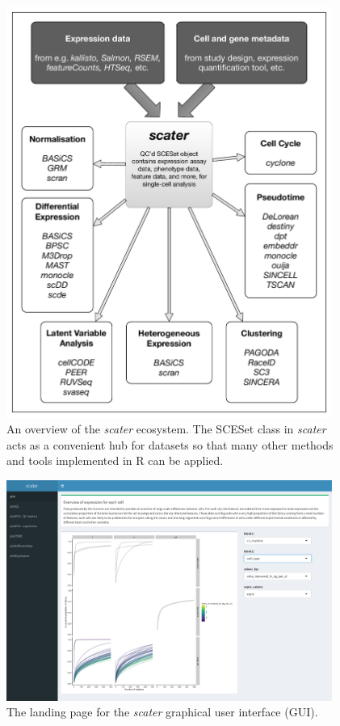 \documentclass[10pt,letterpaper]{article}
\begin{document}
\begin{figure}[!tpb]
\centerline{\includegraphics[width=0.95\textwidth]{figures/scater_ecosystem.pdf}}
\caption{An overview of the \emph{scater} ecosystem. The SCESet class in \emph{scater} acts as a convenient hub for datasets so that many other methods and tools implemented in R can be applied.}\label{fig:scater-eco}
\end{figure}


\begin{figure}[!tpb]
\centerline{\includegraphics[width=0.95\textwidth]{figures/scater_gui_landing_page.pdf}}
\caption{The landing page for the \emph{scater} graphical user interface (GUI).}\label{fig:scater-gui-landing}
\end{figure}
\end{document}
